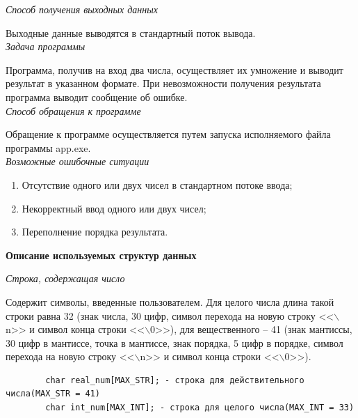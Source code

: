\documentclass[a4paper, 12pt, -shell-escape]{article}  %
\begin{document}
	\textit{Способ получения выходных данных }
	
	Выходные данные выводятся в стандартный поток вывода.\\
	
	\textit{Задача программы}
	
	Программа, получив на вход два числа, осуществляет их умножение и выводит результат в указанном формате. При невозможности получения результата программа выводит сообщение об ошибке.\\
	
	\textit{Способ обращения к программе }
	
	Обращение к программе осуществляется путем запуска исполняемого файла программы app.exe.\\
	
	\textit{Возможные ошибочные ситуации}
	\begin{enumerate} 
		\item Отсутствие одного или двух чисел в стандартном потоке ввода; 
		\item Некорректный ввод одного или двух чисел;
		\item Переполнение порядка результата.\\
	\end{enumerate}





	\newpage
	\begin{center}
	\begin{large}
		\textbf{Описание используемых структур данных}\\
	\end{large}	
	\end{center}
	
	\textit{Строка, содержащая число}
	
	Содержит символы, введенные пользователем. Для целого числа длина такой строки равна 32 (знак числа, 30 цифр, символ перехода на новую строку <<$\backslash$n>> и символ конца строки <<$\backslash$0>>), для вещественного – 41 (знак мантиссы, 30 цифр в мантиссе, точка в мантиссе, знак порядка, 5 цифр в порядке, символ перехода на новую строку <<$\backslash$n>> и символ конца строки <<$\backslash$0>>).
	
	\begin{verbatim}
	    char real_num[MAX_STR]; - строка для действительного числа(MAX_STR = 41)
	    char int_num[MAX_INT]; - строка для целого числа(MAX_INT = 33)
	\end{verbatim}
\end{document}
